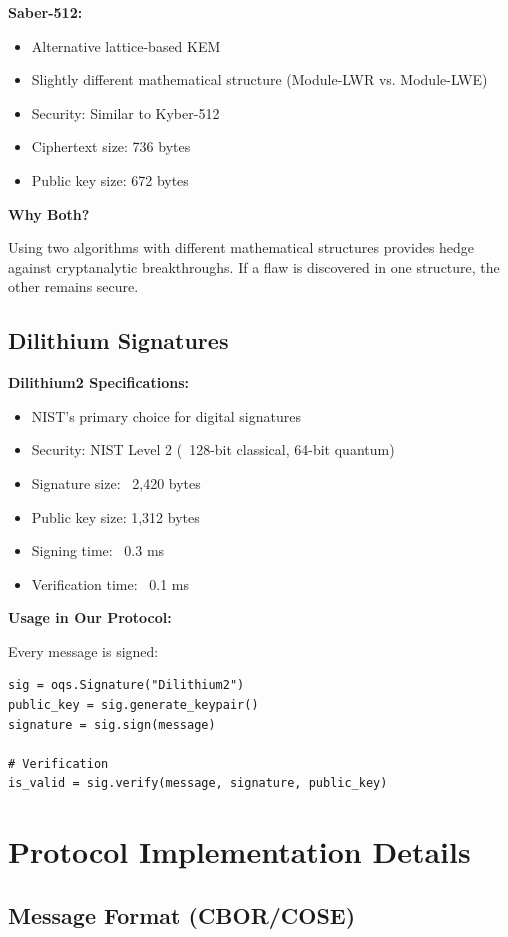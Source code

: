 \documentclass[12pt,a4paper]{report}
\begin{document}
\textbf{Saber-512:}
\begin{itemize}
\item Alternative lattice-based KEM
\item Slightly different mathematical structure (Module-LWR vs. Module-LWE)
\item Security: Similar to Kyber-512
\item Ciphertext size: 736 bytes
\item Public key size: 672 bytes
\end{itemize}

\textbf{Why Both?}

Using two algorithms with different mathematical structures provides hedge against cryptanalytic breakthroughs. If a flaw is discovered in one structure, the other remains secure.

\subsection{Dilithium Signatures}

\textbf{Dilithium2 Specifications:}
\begin{itemize}
\item NIST's primary choice for digital signatures
\item Security: NIST Level 2 (~128-bit classical, 64-bit quantum)
\item Signature size: ~2,420 bytes
\item Public key size: 1,312 bytes
\item Signing time: ~0.3 ms
\item Verification time: ~0.1 ms
\end{itemize}

\textbf{Usage in Our Protocol:}

Every message is signed:
\begin{verbatim}
sig = oqs.Signature("Dilithium2")
public_key = sig.generate_keypair()
signature = sig.sign(message)

# Verification
is_valid = sig.verify(message, signature, public_key)
\end{verbatim}

\section{Protocol Implementation Details}

\subsection{Message Format (CBOR/COSE)}
\end{document}
